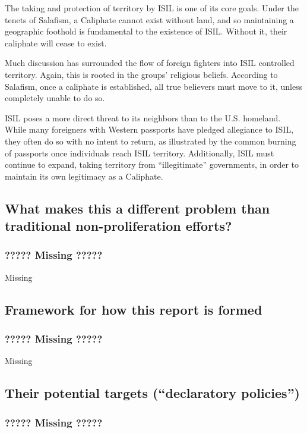 \documentclass{report}
\begin{document}
The taking and protection of territory by ISIL is one of its core goals. Under the tenets of Salafism, a Caliphate cannot exist without land, and so maintaining a geographic foothold is fundamental to the existence of ISIL. Without it, their caliphate will cease to exist. 

Much discussion has surrounded the flow of foreign fighters into ISIL controlled territory. Again, this is rooted in the groups' religious beliefs. According to Salafism, once a caliphate is established, all true believers must move to it, unless completely unable to do so. 

ISIL poses a more direct threat to its neighbors than to the U.S. homeland. While many foreigners with Western passports have pledged allegiance to ISIL, they often do so with no intent to return, as illustrated by the common burning of passports once individuals reach ISIL territory. Additionally, ISIL must continue to expand, taking territory from “illegitimate” governments, in order to maintain its own legitimacy as a Caliphate. 


\subsection{What makes this a different problem than traditional non-proliferation efforts?}

\subsubsection{????? Missing ?????}

Missing


\subsection{Framework for how this report is formed}

\subsubsection{????? Missing ?????}

Missing


\subsection{Their potential targets (“declaratory policies”)}

\subsubsection{????? Missing ?????}
\end{document}
